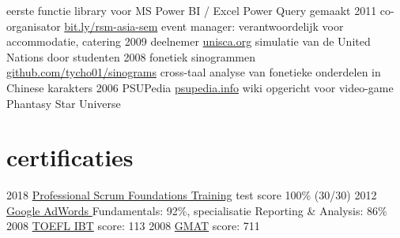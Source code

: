 \documentclass[]{friggeri-cv}
\begin{document}
\begin{entrylist}
    {
      eerste functie library voor
      MS Power BI / Excel Power Query
      gemaakt
    }
  \entry
    {2011}
    {
      co-organisator
    }
    {\href{https://www.facebook.com/Doing-Business-in-Asia-Seminar-310520148998549/}{bit.ly/rsm-asia-sem}}
    {
      event manager:
      verantwoordelijk voor accommodatie, catering
    }
  \entry
    {2009}
    {
      deelnemer
    }
    {\href{http://unisca.org/}{unisca.org}}
    {simulatie van de United Nations door studenten}
  \entry
    {2008}
    {fonetiek sinogrammen}
    {\href{https://github.com/tycho01/sinograms}{github.com/tycho01/sinograms}}
    {cross-taal analyse van fonetieke onderdelen in Chinese karakters}
  \entry
    {2006}
    {PSUPedia}
    {\href{http://psupedia.info/}{psupedia.info}}
    {
      wiki opgericht voor video-game
    Phantasy Star Universe}
\end{entrylist}

\section{certificaties}

\begin{entrylist}
  \entry
    {2018}
    {\href{https://www.scrum.org/courses/professional-scrum-foundations-training}{Professional Scrum Foundations Training}}
    {}
    {test score 100\% (30/30)}
  \entry
    {2012}
    {\href{https://support.google.com/partners/answer/3154326}{Google AdWords }}
    {}
    {Fundamentals: 92\%,
    specialisatie
    Reporting \& Analysis: 86\%}
  \entry
    {2008}
    {\href{https://www.ets.org/toefl/ibt}{TOEFL IBT}}
    {}
    {score: 113}
  \entry
    {2008}
    {\href{https://www.mba.com/}{GMAT}}
    {}
    {score: 711}
\end{entrylist}
\end{document}

